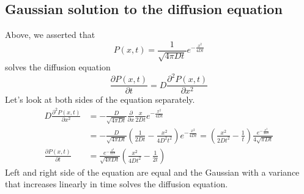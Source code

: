 \subsection*{Gaussian solution to the diffusion equation}
Above, we asserted that
\begin{equation}
	P(x,t) = \frac{1}{\sqrt{4\pi Dt}}e^{-\frac{x^2}{4Dt}}
\end{equation}
solves the diffusion equation
\begin{equation}
	\frac{\partial P(x,t)}{\partial t} = D \frac{\partial^2 P(x,t)}{\partial x^2}
\end{equation}
Let's look at both sides of the equation separately.
\begin{equation}
\begin{split}
	D \frac{\partial^2 P(x,t)}{\partial x^2} & = -\frac{D}{\sqrt{4\pi Dt}}\frac{\partial}{\partial x}\frac{x}{2Dt} e^{-\frac{x^2}{4Dt}} \\
	&= -\frac{D}{\sqrt{4\pi Dt}}\left(\frac{1}{2Dt} - \frac{x^2}{4D^2t^2}\right) e^{-\frac{x^2}{4Dt}} =
	\left(\frac{x^2}{2D t^2} - \frac{1}{t}\right)\frac{e^{-\frac{x^2}{4Dt}}}{4\sqrt{\pi Dt}}\\
	\frac{\partial P(x,t)}{\partial t} &= \frac{e^{-\frac{x^2}{4Dt}}}{\sqrt{4\pi Dt}}\left(\frac{x^2}{4Dt^2}-\frac{1}{2t}\right)
\end{split}
\end{equation}
Left and right side of the equation are equal and the Gaussian with a variance that increases linearly in time solves the diffusion equation.
